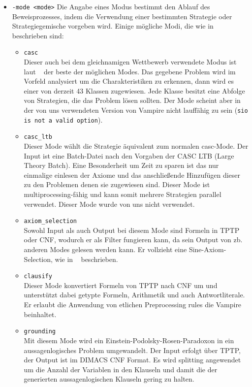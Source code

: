 \documentclass{article}
\begin{document}
\begin{itemize}
\item \verb|-mode <mode>| \label{arg:modes}
Die Angabe eines Modus bestimmt den Ablauf des Beweisprozesses, 
indem die Verwendung einer bestimmten Strategie oder Strategiegemische vorgeben wird.
Einige mögliche Modi, die wie in ~\cite{hoder2011slides} beschrieben sind:
\begin{itemize}
	\item \verb|casc| \\
	Dieser auch bei dem gleichnamigen Wettbewerb verwendete Modus ist laut ~\cite{hoder2011slides} der beste der möglichen Modes.
	Das gegebene Problem wird im Vorfeld analysiert um die Charakteristiken zu erkennen, dann wird es einer von derzeit 43 Klassen zugewiesen. Jede Klasse besitzt eine Abfolge von Strategien, die das Problem lösen sollten.
	Der Mode scheint aber in der von uns verwendeten Version von Vampire nicht lauffähig zu sein (\texttt{sio is not a valid option}).
	\item \verb|casc_ltb| \\
	Dieser Mode wählt die Strategie äquivalent zum normalen casc-Mode. Der Input ist eine Batch-Datei nach den Vorgaben der CASC LTB (Large Theory Batch). Eine Besonderheit um Zeit zu sparen ist das nur einmalige einlesen der Axiome und das anschließende Hinzufügen dieser zu den Problemen denen sie zugewiesen sind. Dieser Mode ist multiprocessing-fähig und kann somit mehrere Strategien parallel verwendet. Dieser Mode wurde von uns nicht verwendet.
	\item \verb|axiom_selection| \\
	Sowohl Input als auch Output bei diesem Mode sind Formeln in TPTP oder CNF, wodurch er als Filter fungieren kann, da sein Output von zb. anderen Modes gelesen werden kann.
	Er vollzieht eine Sine-Axiom-Selection, wie in ~\cite{sinquanon} beschrieben.
	\item \verb|clausify| \\
	Dieser Mode konvertiert Formeln von TPTP nach CNF um und unterstützt dabei getypte Formeln, Arithmetik und auch Antwortliterale. Er erlaubt die Anwendung von etlichen Preprocessing rules die Vampire beinhaltet.
	\item \verb|grounding| \\
	Mit diesem Mode wird ein Einstein-Podolsky-Rosen-Paradoxon in ein aussagenlogisches Problem umgewandelt. Der Input erfolgt über TPTP, der Output ist im DIMACS CNF Format.
	Es wird splitting angewendet um die Anzahl der Variablen in den Klauseln und damit die der generierten aussagenlogischen Klauseln gering zu halten.

\end{itemize}
\end{itemize}
\end{document}
